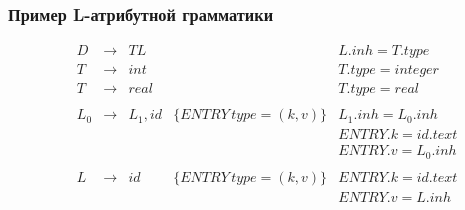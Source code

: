 \documentclass{beamer}
\begin{document}
\begin{frame}[fragile]
  \transwipe[direction=90]
  \frametitle{Пример L-атрибутной грамматики}
$$
\begin{array}{ccclll}
&D  & \rightarrow & TL      &                                & L.inh = T.type \\
&T  & \rightarrow & int     &                                & T.type = integer \\
&T  & \rightarrow & real    &                                & T.type = real \\~\\

&L_0& \rightarrow & L_1, id & \{ENTRY \, type=(k, v)\} & L_1.inh = L_0.inh \\
&   &             &         &                                & ENTRY.k = id.text \\
&   &             &         &                                & ENTRY.v = L_0.inh \\~\\ 

& L & \rightarrow &  id     & \{ENTRY \, type=(k, v)\} & ENTRY.k = id.text \\
&   &             &         &                                & ENTRY.v = L.inh \\
\end{array}
$$  
\end{frame}
\end{document}

